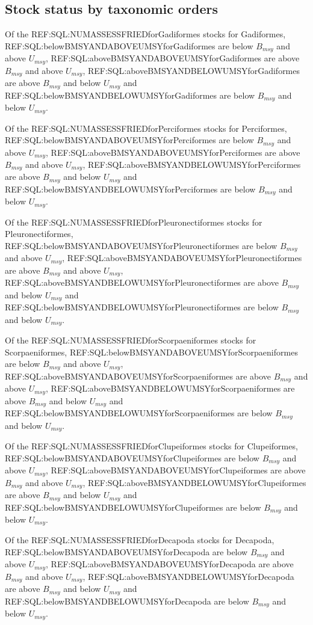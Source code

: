 \subsection*{Stock status by taxonomic orders}

Of the REF:SQL:NUMASSESSFRIEDforGadiformes stocks for Gadiformes, REF:SQL:belowBMSYANDABOVEUMSYforGadiformes are below $B_{msy}$ and above $U_{msy}$, REF:SQL:aboveBMSYANDABOVEUMSYforGadiformes are above $B_{msy}$ and above $U_{msy}$, REF:SQL:aboveBMSYANDBELOWUMSYforGadiformes are above $B_{msy}$ and below $U_{msy}$ and REF:SQL:belowBMSYANDBELOWUMSYforGadiformes are below $B_{msy}$ and below $U_{msy}$.

Of the REF:SQL:NUMASSESSFRIEDforPerciformes stocks for Perciformes, REF:SQL:belowBMSYANDABOVEUMSYforPerciformes are below $B_{msy}$ and above $U_{msy}$, REF:SQL:aboveBMSYANDABOVEUMSYforPerciformes are above $B_{msy}$ and above $U_{msy}$, REF:SQL:aboveBMSYANDBELOWUMSYforPerciformes are above $B_{msy}$ and below $U_{msy}$ and REF:SQL:belowBMSYANDBELOWUMSYforPerciformes are below $B_{msy}$ and below $U_{msy}$.

Of the REF:SQL:NUMASSESSFRIEDforPleuronectiformes stocks for Pleuronectiformes, REF:SQL:belowBMSYANDABOVEUMSYforPleuronectiformes are below $B_{msy}$ and above $U_{msy}$, REF:SQL:aboveBMSYANDABOVEUMSYforPleuronectiformes are above $B_{msy}$ and above $U_{msy}$, REF:SQL:aboveBMSYANDBELOWUMSYforPleuronectiformes are above $B_{msy}$ and below $U_{msy}$ and REF:SQL:belowBMSYANDBELOWUMSYforPleuronectiformes are below $B_{msy}$ and below $U_{msy}$.

Of the REF:SQL:NUMASSESSFRIEDforScorpaeniformes stocks for Scorpaeniformes, REF:SQL:belowBMSYANDABOVEUMSYforScorpaeniformes are below $B_{msy}$ and above $U_{msy}$, REF:SQL:aboveBMSYANDABOVEUMSYforScorpaeniformes are above $B_{msy}$ and above $U_{msy}$, REF:SQL:aboveBMSYANDBELOWUMSYforScorpaeniformes are above $B_{msy}$ and below $U_{msy}$ and REF:SQL:belowBMSYANDBELOWUMSYforScorpaeniformes are below $B_{msy}$ and below $U_{msy}$.

Of the REF:SQL:NUMASSESSFRIEDforClupeiformes stocks for Clupeiformes, REF:SQL:belowBMSYANDABOVEUMSYforClupeiformes are below $B_{msy}$ and above $U_{msy}$, REF:SQL:aboveBMSYANDABOVEUMSYforClupeiformes are above $B_{msy}$ and above $U_{msy}$, REF:SQL:aboveBMSYANDBELOWUMSYforClupeiformes are above $B_{msy}$ and below $U_{msy}$ and REF:SQL:belowBMSYANDBELOWUMSYforClupeiformes are below $B_{msy}$ and below $U_{msy}$.

Of the REF:SQL:NUMASSESSFRIEDforDecapoda stocks for Decapoda, REF:SQL:belowBMSYANDABOVEUMSYforDecapoda are below $B_{msy}$ and above $U_{msy}$, REF:SQL:aboveBMSYANDABOVEUMSYforDecapoda are above $B_{msy}$ and above $U_{msy}$, REF:SQL:aboveBMSYANDBELOWUMSYforDecapoda are above $B_{msy}$ and below $U_{msy}$ and REF:SQL:belowBMSYANDBELOWUMSYforDecapoda are below $B_{msy}$ and below $U_{msy}$.


